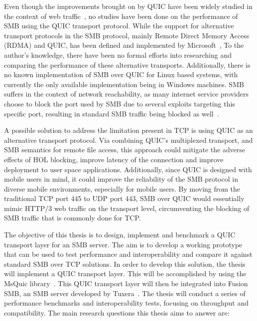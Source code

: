 \documentclass[english, 12pt, a4paper, elec, utf8, a-2b, online]{aaltothesis}
\begin{document}
Even though the improvements brought on by QUIC have been widely studied in the context
of web traffic~\cite{quic_better_for_what,evaluating_quic_perf,quic_and_tcp_performance},
no studies have been done on the performance of SMB using the QUIC transport protocol.
While the support for alternative transport protocols in the SMB protocol, mainly
Remote Direct Memory Access (RDMA) and QUIC, has been defined and implemented by Microsoft~\cite{smb2},
To the author's knowledge, there have been no formal
efforts into researching and comparing the performance of these alternative transports.
Additionally, there is no known implementation of SMB over QUIC for Linux
based systems, with currently the only available implementation being in Windows machines.
SMB suffers in the context of network reachability, as many internet service providers
choose to block the port used by SMB due to several exploits targeting this specific port,
resulting in standard SMB traffic being blocked as well~\cite{bitag_port_blocking}.

A possible solution to address the limitation present in TCP is using
QUIC as an alternative transport protocol. Via combining QUIC's multiplexed transport,
and SMB semantics for remote file access, this approach could mitigate the adverse effects of
HOL blocking, improve latency of the connection and improve deployment to user space
applications. Additionally, since QUIC is designed with mobile users in mind, it could
improve the reliability of the SMB protocol in diverse mobile environments, especially
for mobile users. By moving from the traditional TCP port 445 to UDP port 443,
SMB over QUIC would essentially mimic HTTP/3 web traffic on the transport level,
circumventing the blocking of SMB traffic that is commonly done for TCP.

The objective of this thesis is to design, implement and benchmark a QUIC transport
layer for an SMB server. The aim is to develop a working prototype that can be used to
test performance and interoperability and compare it against standard SMB over TCP solutions.
In order to develop this solution, the thesis will implement a QUIC transport layer. This
will be accomplished by using the MsQuic library~\cite{msquic}. This QUIC transport layer
will then be integrated into Fusion SMB, an SMB server developed by Tuxera~\cite{fusion}.
The thesis will conduct a series of performance benchmarks and interoperability tests,
focusing on throughput and compatibility. The main research questions this thesis aims to answer are:
\end{document}
